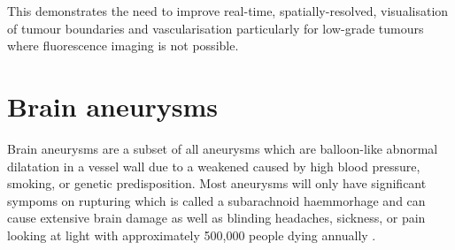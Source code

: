 This demonstrates the need to improve real-time, spatially-resolved, visualisation of tumour boundaries and vascularisation particularly for low-grade tumours where fluorescence imaging is not possible. 

\section{Brain aneurysms}
Brain aneurysms are a subset of all aneurysms which are balloon-like abnormal dilatation in a vessel wall due to a weakened caused by high blood pressure, smoking, or genetic predisposition\cite{NationalHealthService2022}. Most aneurysms will only have significant sympoms on rupturing which is called a subarachnoid haemmorhage and can cause extensive brain damage as well as blinding headaches, sickness, or pain looking at light \cite{NationalHealthService2022} with approximately 500,000 people dying annually \cite{Toth2018}. 

